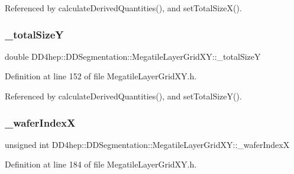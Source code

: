 Referenced by calculate\+Derived\+Quantities(), and set\+Total\+Size\+X().

\hypertarget{class_d_d4hep_1_1_d_d_segmentation_1_1_megatile_layer_grid_x_y_a872eaf618286c808f1cb93e7756a6c7c}{}\label{class_d_d4hep_1_1_d_d_segmentation_1_1_megatile_layer_grid_x_y_a872eaf618286c808f1cb93e7756a6c7c} 
\subsubsection{\texorpdfstring{\+\_\+total\+SizeY}{\_totalSizeY}}
{\footnotesize\ttfamily double D\+D4hep\+::\+D\+D\+Segmentation\+::\+Megatile\+Layer\+Grid\+X\+Y\+::\+\_\+total\+SizeY\hspace{0.3cm}{\ttfamily [protected]}}



Definition at line 152 of file Megatile\+Layer\+Grid\+X\+Y.\+h.



Referenced by calculate\+Derived\+Quantities(), and set\+Total\+Size\+Y().

\hypertarget{class_d_d4hep_1_1_d_d_segmentation_1_1_megatile_layer_grid_x_y_ae5d63f80a247fc98ec77fea73d93be60}{}\label{class_d_d4hep_1_1_d_d_segmentation_1_1_megatile_layer_grid_x_y_ae5d63f80a247fc98ec77fea73d93be60} 
\subsubsection{\texorpdfstring{\+\_\+wafer\+IndexX}{\_waferIndexX}}
{\footnotesize\ttfamily unsigned int D\+D4hep\+::\+D\+D\+Segmentation\+::\+Megatile\+Layer\+Grid\+X\+Y\+::\+\_\+wafer\+IndexX\hspace{0.3cm}{\ttfamily [protected]}}



Definition at line 184 of file Megatile\+Layer\+Grid\+X\+Y.\+h.

